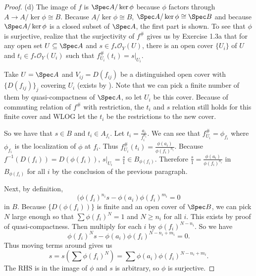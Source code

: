 \begin{proof}
	(d) The image of $f $ is $\Spec A / \ker \phi $ because $\phi  $ factors through $A \to A / \ker \phi \cong B $.
	Because $A / \ker \phi \cong B $, $\Spec A / \ker \phi \cong \Spec B $ and because $\Spec A / \ker \phi$ is a closed subset of $\Spec A $, the first part is shown.
	To see that $\phi  $ is surjective, realize that the surjectivity of $f^\# $ gives us by Exercise 1.3a that for any open set $U \subseteq \Spec A $ and $s\in f_\ast\mathcal{O}_Y(U) $, there is an open cover $\{U_i\}   $ of $U $ and $t_i \in f_\ast\mathcal{O}_Y(U_i)$ such that $f^\#_{U_i}(t_i) = s\big|_{U_i} $.

	Take $U = \Spec A $ and $V_{ij} = D(f_{ij})   $ be a distinguished open cover with $\{D(f_{ij})\}_j$ covering $U_i $ (exists by ).
	Note that we can pick a finite number of them by quasi-compactness of $\Spec A $, so let $U_i $ be this cover.
	Because of commuting relation of $f^\# $ with restriction, the $t_i $ and $s $ relation still holds for this finite cover and WLOG let the $t_i $ be the restrictions to the new cover.

	So we have that $s\in B $ and $t_i \in A_{f_i} $.
	Let $t_i = \frac{a_i}{f_i^{n_i} } $.
	We can see that $f^\#_{U_i} = \phi_{f_i}$ where $\phi _{f_i} $ is the localization of $\phi  $ at $f_i $.
	Thus $f^\#_{U_i}(t_i) = \frac{\phi (a_i)}{\phi (f_i)^{n_i} } $.
	Because $f^{-1}(D(f_i)) = D(\phi (f_i)) $, $s\big|_{U_i} = \frac{s}{1} \in B_{\phi (f_i)}$.
	Therefore $\frac{s}{1} = \frac{\phi (a_i)}{\phi (f_i)^{n_i} } $ in $B_{\phi (f_i)} $ for all $i $ by the conclusion of the previous paragraph.

	Next, by definition,
	\begin{equation}\label{eqn:2.18}
		(\phi (f_i)^{n_i}s - \phi(a_{i})\phi(f_i)^{m_i} = 0
	\end{equation}
	in $B $.
	Because $\{D(\phi (f_i))\}   $ is finite and an open cover of $\Spec B $, we can pick $N $ large enough so that $\sum \phi (f_i)^N = 1 $ and $N \ge n_i $ for all $i $.
	This exists by proof of quasi-compactness.
	Then multiply  for each $i $ by $\phi (f_i)^{N-n_i}  $.
	So we have
	\[
		\phi (f_i)^{N}s - \phi (a_i)\phi (f_i)^{N-n_i+m_i} = 0  
	.\] 
	Thus moving terms around gives us
	\[
		s = s\left(\sum \phi (f_i)^N\right) = \sum \phi(a_i)\phi (f_i)^{N-n_i+m_i} 
	.\] 
	The RHS is in the image of $\phi  $ and $s $ is arbitrary, so $\phi  $ is surjective.
\end{proof}

